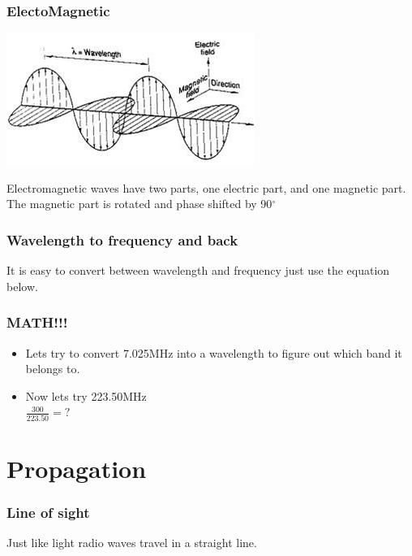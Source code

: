 \documentclass[10pt]{beamer}
\begin{document}
\begin{frame}
\frametitle{ElectoMagnetic}
\begin{center}
\includegraphics[height=0.5\textheight]{emwave.png}\\
\end{center}
Electromagnetic waves have two parts, one electric part, and one magnetic part. The magnetic part is rotated and phase shifted by 90$^{\circ}$
\end{frame}

\begin{frame}
\frametitle{Wavelength to frequency and back}
It is easy to convert between wavelength and frequency just use the equation below.\\
\end{frame}

\begin{frame}
\frametitle{MATH!!!}
\begin{itemize}
\item Lets try to convert 7.025MHz into a wavelength to figure out which band it belongs to.\\
 
\item<5-> Now lets try 223.50MHz\\
$\frac{300}{223.50}=?$ 
\end{itemize}
\end{frame}

\section{Propagation}
\begin{frame}
\frametitle{Line of sight}
Just like light radio waves travel in a straight line.\\
\end{frame}
\end{document}
